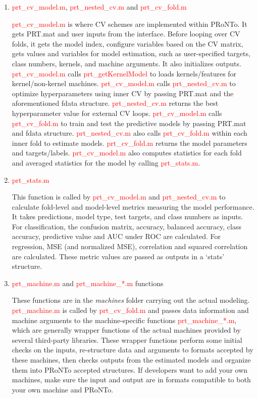 \begin{enumerate}

\item \textcolor{red}{prt\_cv\_model.m}, \textcolor{red}{prt\_nested\_cv.m} and \textcolor{red}{prt\_cv\_fold.m}

\textcolor{red}{prt\_cv\_model.m} is where CV schemes are implemented within PRoNTo. It gets PRT.mat and user inputs from the interface.  Before looping over CV folds, it gets the model index, configure variables based on the CV matrix, gets values and variables for model estimation, such as user-specified targets, class numbers, kernels, and machine arguments. It also initializes outputs. \textcolor{red}{prt\_cv\_model.m} calls \textcolor{red}{prt\_getKernelModel} to loads kernels/features for kernel/non-kernel machines. \textcolor{red}{prt\_cv\_model.m} calls \textcolor{red}{prt\_nested\_cv.m} to optimize hyperparameters using inner CV by passing PRT.mat and the aforementioned fdata structure. \textcolor{red}{prt\_nested\_cv.m} returns the best hyperparameter value for external CV loops. \textcolor{red}{prt\_cv\_model.m} calls \textcolor{red}{prt\_cv\_fold.m} to train and test the predictive models by passing PRT.mat and fdata structure. \textcolor{red}{prt\_nested\_cv.m} also calls \textcolor{red}{prt\_cv\_fold.m} within each inner fold to estimate models. \textcolor{red}{prt\_cv\_fold.m} returns the model parameters and targets/labels. \textcolor{red}{prt\_cv\_model.m} also computes statistics for each fold and averaged statistics for the model by calling \textcolor{red}{prt\_stats.m}. 
       
\item \textcolor{red}{prt\_stats.m}

This function is called by \textcolor{red}{prt\_cv\_model.m} and \textcolor{red}{prt\_nested\_cv.m} to calculate fold-level and model-level metrics measuring the model performance. It takes predictions, model type, test targets, and class numbers as inputs.  For classification, the confusion matrix, accuracy, balanced accuracy, class accuracy, predictive value and AUC under ROC are calculated.  For regression, MSE (and normalized MSE), correlation and squared correlation are calculated. These metric values are passed as outputs in a ‘stats’ structure.
       
\item \textcolor{red}{prt\_machine.m} and \textcolor{red}{prt\_machine\_*.m} functions

These functions are in the \textit{machines} folder carrying out the actual modeling. \textcolor{red}{prt\_machine.m} is called by \textcolor{red}{prt\_cv\_fold.m} and passes data information and machine arguments to the machine-specific functions \textcolor{red}{prt\_machine\_*.m}, which are generally wrapper functions of the actual machines provided by several third-party libraries. These wrapper functions perform some initial checks on the inputs, re-structure data and arguments to formats accepted by these machines, then checks outputs from the estimated models and organize them into PRoNTo accepted structures. If developers want to add your own machines, make sure the input and output are in formats compatible to both your own machine and PRoNTo.  


\end{enumerate}
